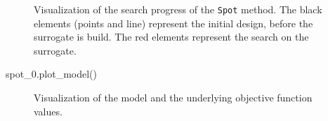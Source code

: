\documentclass[
  letterpaper,
  DIV=11,
  numbers=noendperiod]{scrreprt}
\newenvironment{Shaded}{\begin{snugshade}}{\end{snugshade}}
\newcommand{\NormalTok}[1]{\textcolor[rgb]{0.00,0.23,0.31}{#1}}
\begin{document}
\begin{figure}[H]


\caption{\label{fig-spot-progress}Visualization of the search progress
of the \texttt{Spot} method. The black elements (points and line)
represent the initial design, before the surrogate is build. The red
elements represent the search on the surrogate.}

\end{figure}%

\begin{Shaded}
\begin{Highlighting}[]
\NormalTok{spot\_0.plot\_model()}
\end{Highlighting}
\end{Shaded}

\begin{figure}[H]


\caption{\label{fig-spot-model-1d}Visualization of the model and the
underlying objective function values.}

\end{figure}%
\end{document}
